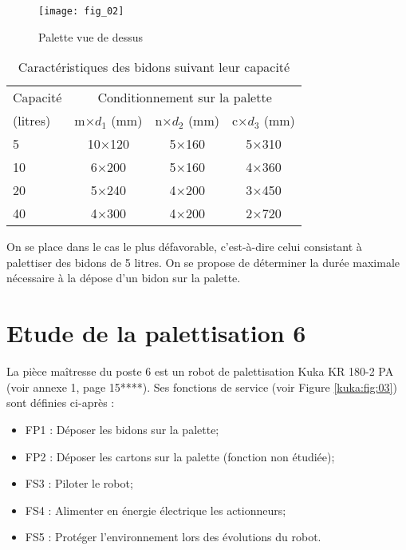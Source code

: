 \begin{figure}[H]
\centering
\texttt{[image: fig\_02]}
\caption{Palette vue de dessus \label{kuka:fig:02}}
\end{figure}


\begin{table}[H]
\centering
\begin{tabular}{lccc}
\hline
Capacité & \multicolumn{3}{c}{Conditionnement sur la palette} \\
(litres) 	& m×$d_1$ (mm)	& n×$d_2$ (mm)	& c×$d_3$ (mm)  \\
5	& 10×120	& 5×160	& 5×310 \\
10	& 6×200	& 5×160	& 4×360 \\
20	& 5×240	& 4×200	& 3×450 \\
40	& 4×300	& 4×200	& 2×720 \\
\hline
\end{tabular}
\caption{Caractéristiques des bidons suivant leur capacité \label{kuka:tab:01}}
\end{table} 

On se place dans le cas le plus défavorable, c'est-à-dire celui consistant à 
palettiser des bidons de 5 litres. On se propose de déterminer la durée maximale nécessaire à 
la dépose d’un bidon sur la palette. 






\section{Etude de la palettisation 6}
La pièce maîtresse du poste 6 est un robot de palettisation Kuka KR 180-2 PA (voir annexe 1, 
page 15****). Ses fonctions de service (voir Figure \ref{kuka:fig:03}) sont définies ci-après : 
\begin{itemize}
\item FP1 : Déposer les bidons sur la palette;
\item FP2 : Déposer les cartons sur la palette (fonction non étudiée);
\item FS3 : Piloter le robot;
\item FS4 : Alimenter en énergie électrique les actionneurs;
\item FS5 : Protéger l’environnement lors des évolutions du robot.
\end{itemize}


